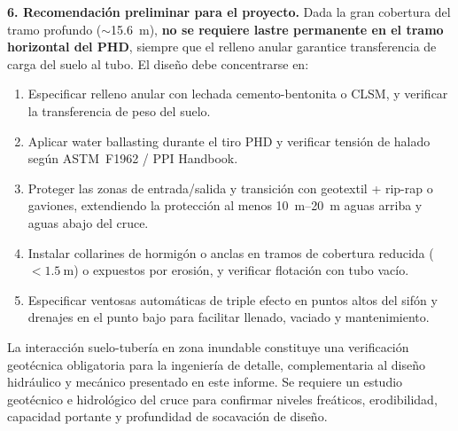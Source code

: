 \textbf{6. Recomendación preliminar para el proyecto.} Dada la gran cobertura del tramo profundo ($\sim$\SI{15.6}{\meter}), \textbf{no se requiere lastre permanente en el tramo horizontal del PHD}, siempre que el relleno anular garantice transferencia de carga del suelo al tubo. El diseño debe concentrarse en:

\begin{enumerate}
    \item Especificar relleno anular con lechada cemento-bentonita o CLSM, y verificar la transferencia de peso del suelo.
    \item Aplicar water ballasting durante el tiro PHD y verificar tensión de halado según ASTM~F1962 / PPI Handbook.
    \item Proteger las zonas de entrada/salida y transición con geotextil + rip-rap o gaviones, extendiendo la protección al menos \SI{10}{\meter}--\SI{20}{\meter} aguas arriba y aguas abajo del cruce.
    \item Instalar collarines de hormigón o anclas en tramos de cobertura reducida ($<\SI{1.5}{\meter}$) o expuestos por erosión, y verificar flotación con tubo vacío.
    \item Especificar ventosas automáticas de triple efecto en puntos altos del sifón y drenajes en el punto bajo para facilitar llenado, vaciado y mantenimiento.
\end{enumerate}

La interacción suelo-tubería en zona inundable constituye una verificación geotécnica obligatoria para la ingeniería de detalle, complementaria al diseño hidráulico y mecánico presentado en este informe. Se requiere un estudio geotécnico e hidrológico del cruce para confirmar niveles freáticos, erodibilidad, capacidad portante y profundidad de socavación de diseño.

